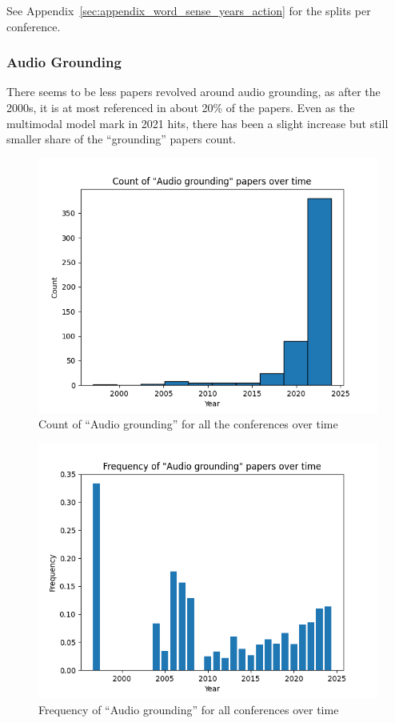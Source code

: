 \documentclass[11pt]{article}
\begin{document}
See Appendix~\ref{sec:appendix_word_sense_years_action} for the splits per conference.

\subsubsection{Audio Grounding}
There seems to be less papers revolved around audio grounding, as after the 2000s, it is at most referenced in about 20\% of the papers. Even as the multimodal model mark in 2021 hits, there has been a slight increase but still smaller share of the ``grounding'' papers count.
\begin{figure}[h!]
  \includegraphics[width=\columnwidth]{figs/grounding_figs/Audio/all_confs_grounding_Audio.png}
  \caption{Count of ``Audio grounding'' for all the conferences over time}
  \label{fig:audio_all_confs_count}
\end{figure}

\begin{figure}[h!]
  \includegraphics[width=\columnwidth]{figs/freq_grounding_figs/Audio/all_confs_grounding_Audio.png}
  \caption{Frequency of ``Audio grounding'' for all conferences over time}
  \label{fig:audio_all_confs_freq}
\end{figure}
\end{document}
